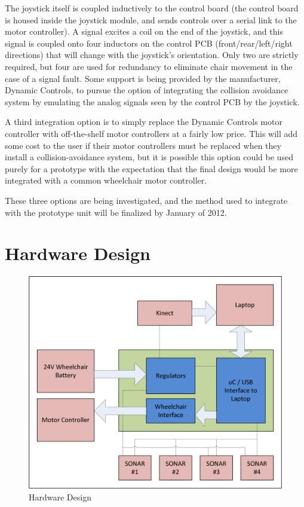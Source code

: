 \documentclass[oneside,final,a4paper]{report}
\begin{document}
The joystick itself is coupled inductively to the control board (the control board is housed inside the joystick module, and sends controls over a serial link to the motor controller). A signal excites a coil on the end of the joystick, and this signal is coupled onto four inductors on the control PCB (front/rear/left/right directions) that will change with the joystick's orientation. Only two are strictly required, but four are used for redundancy to eliminate chair movement in the case of a signal fault. Some support is being provided by the manufacturer, Dynamic Controls, to pursue the option of integrating the collision avoidance system by emulating the analog signals seen by the control PCB by the joystick.

A third integration option is to simply replace the Dynamic Controls motor controller with off-the-shelf motor controllers at a fairly low price. This will add some cost to the user if their motor controllers must be replaced when they install a collision-avoidance system, but it is possible this option could be used purely for a prototype with the expectation that the final design would be more integrated with a common wheelchair motor controller.

These three options are being investigated, and the method used to integrate with the prototype unit will be finalized by January of 2012.

\section{Hardware Design}
\begin{figure}[hbt]
 \centering
 \includegraphics[scale=0.9]{Hardware_Diagram}
 \caption{Hardware Design}\label{fig:hardware}
\end{figure}
\end{document}
